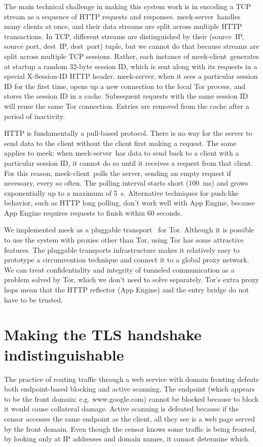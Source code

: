 \documentclass[conference]{IEEEtran}
\def\meekclient{\mbox{meek-client}}
\def\meekserver{\mbox{meek-server}}
\begin{document}
The main technical challenge in making this system work
is in encoding a TCP stream as a sequence of HTTP requests and responses.
\meekserver\ handles many clients at once, and their data streams
are split across multiple HTTP transactions.
In TCP, different streams are distinguished by their
(source~IP, source port, dest~IP, dest~port) tuple,
but we cannot do that because streams are split across multiple TCP sessions.
Rather, each instance of \meekclient\ generates at startup a random 32-byte
session ID, which is sent along with its requests in a special
X-Session-ID HTTP header.
\meekserver, when it sees a particular session ID for the first time,
opens up a new connection to the local Tor process,
and stores the session ID in a cache. Subsequent requests with the
same session ID will reuse the same Tor connection.
Entries are removed from the cache after a period of inactivity.

HTTP is fundamentally a pull-based protocol.
There is no way for the server to send data to the client without
the client first making a request.
The same applies to meek: when \meekserver\ has data to send back to
a client with a particular session ID, it cannot do so until it
receives a request from that client.
For this reason, \meekclient\ polls the server,
sending an empty request if necessary, every so often.
The polling interval starts short (100~ms) and grows exponentially
up to a maximum of 5~s.
Alternative techniques for push-like behavior,
such as HTTP long polling,
don't work well with App Engine,
because App Engine requires requests to finish within 60 seconds.

We implemented meek as a pluggable transport~\cite{pt} for Tor.
Although it is possible to use the system with proxies other than Tor,
using Tor has some attractive features.
The pluggable transports infrastructure makes it relatively easy to prototype
a circumvention technique and connect it to a global proxy network.
We can treat confidentiality and integrity of tunneled communication
as a problem solved by Tor, which we don't need to solve separately.
Tor's extra proxy hops mean that the HTTP reflector (App Engine)
and the entry bridge do not have to be trusted.

\section{Making the TLS handshake indistinguishable}
\label{sec:browserextension}

The practice of routing traffic through a web service with domain fronting
defeats both endpoint-based blocking and active scanning.
The endpoint (which appears to be the front domain; e.g. www.google.com)
cannot be blocked because to block it would cause collateral damage.
Active scanning is defeated because if the censor accesses the same
endpoint as the client, all they see is a web page served by the front domain.
Even though the censor knows some traffic is being fronted,
by looking only at IP addresses and domain names, it cannot determine which.
\end{document}
